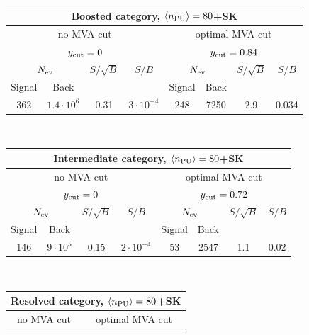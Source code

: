\begin{table}[t]
  \centering
  \begin{tabular}{c|c|c|c||c|c|c|c}
    \hline
    \multicolumn{8}{c}{Boosted category, $\left\langle n_{\rm PU}\right\rangle=80$+SK}\\
    \hline
    \hline
    \multicolumn{4}{c||}{no MVA cut} & \multicolumn{4}{c}{optimal MVA cut}\\
    \multicolumn{4}{c||}{$y_{\rm cut}=0$} & \multicolumn{4}{c}{$y_{\rm cut}=0.84$}\\
    \hline
    \multicolumn{2}{c|}{$N_{\rm ev}$} &  $S/\sqrt{B}$  & $S/B$
    & \multicolumn{2}{c|}{$N_{\rm ev}$} &  $S/\sqrt{B}$  & $S/B$\\
        Signal & Back   &     &   &  Signal & Back   &     &    \\
    \hline
    362  &  $1.4\cdot 10^6$     & 0.31       &  $3\cdot 10^{-4}$ &
    248     &   7250             &  2.9       & 0.034 \\
        \hline
  \end{tabular}
   $\,$\\
  \vspace{0.4cm}
  \noindent
  \begin{tabular}{c|c|c|c||c|c|c|c}
    \hline
    \multicolumn{8}{c}{Intermediate category,  $\left\langle n_{\rm PU}\right\rangle=80$+SK}\\
    \hline
    \hline
    \multicolumn{4}{c||}{no MVA cut} & \multicolumn{4}{c}{optimal MVA cut}\\
    \multicolumn{4}{c||}{$y_{\rm cut}=0$} & \multicolumn{4}{c}{$y_{\rm cut}=0.72$}\\
    \hline
    \multicolumn{2}{c|}{$N_{\rm ev}$} &  $S/\sqrt{B}$  & $S/B$
    & \multicolumn{2}{c|}{$N_{\rm ev}$} &  $S/\sqrt{B}$  & $S/B$\\
        Signal & Back   &     &   &  Signal & Back   &     &    \\
    \hline
    146  &    $9\cdot 10^5$   & 0.15        &  $2\cdot 10^{-4}$      &
  53  &  2547        & 1.1        &  0.02 \\
        \hline
  \end{tabular}
    $\,$\\
  \vspace{0.4cm}
  \noindent
  \begin{tabular}{c|c|c|c||c|c|c|c}
    \hline
    \multicolumn{8}{c}{Resolved category,  $\left\langle n_{\rm PU}\right\rangle=80$+SK}\\
    \hline
    \hline
    \multicolumn{4}{c||}{no MVA cut} & \multicolumn{4}{c}{optimal MVA cut}\\

\end{tabular}
\end{table}

